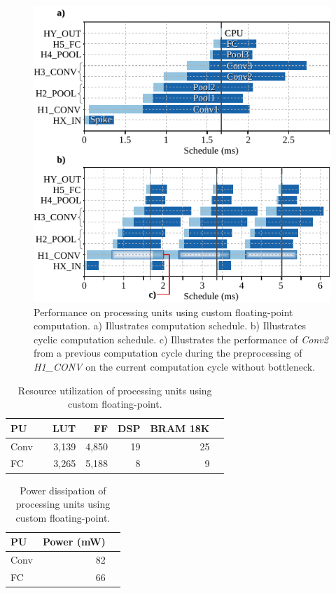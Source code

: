 \begin{figure}[h!]
	\centering
	\includegraphics[width=1\columnwidth]{../figures/latency_cfp_cycle.pdf}
	\caption{Performance on processing units using custom floating-point computation. a) Illustrates computation schedule. b) Illustrates cyclic computation schedule. c) Illustrates the performance of \emph{Conv2} from a previous computation cycle during the preprocessing of \emph{H1\_CONV} on the current computation cycle without bottleneck.}
	\label{fig:latency_pu_cfp_cycle}
\end{figure}

\begin{table}[h!]\centering
	\caption{Resource utilization of processing units using custom floating-point.}\label{tab:resource_cfp}
	\scriptsize
	\begin{tabular}{lrrrrrr}\toprule
		\textbf{PU} & &\textbf{LUT} &\textbf{FF} &\textbf{DSP} &\textbf{BRAM 18K} \\\midrule
		Conv & &3,139 &4,850 &19 &25 \\
		FC & &3,265 &5,188 &8 &9 \\
		\bottomrule
	\end{tabular}
\end{table}

\begin{table}[h!]\centering
	\caption{Power dissipation of processing units using custom floating-point.}\label{tab:power_cfp}
	\scriptsize
	\begin{tabular}{lrr}\toprule
		\textbf{PU} &\textbf{Power (mW)} \\\midrule
		Conv &82 \\
		FC &66 \\
		\bottomrule
	\end{tabular}
\end{table}

